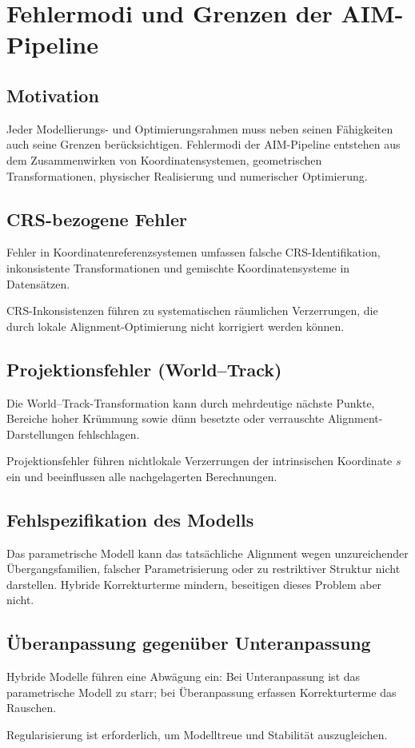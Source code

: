 \section{Fehlermodi und Grenzen der AIM-Pipeline}
\subsection*{Motivation}
Jeder Modellierungs- und Optimierungsrahmen muss neben seinen Fähigkeiten auch
seine Grenzen berücksichtigen. Fehlermodi der AIM-Pipeline entstehen aus dem
Zusammenwirken von Koordinatensystemen, geometrischen Transformationen,
physischer Realisierung und numerischer Optimierung.

\subsection{CRS-bezogene Fehler}
Fehler in Koordinatenreferenzsystemen umfassen falsche CRS-Identifikation,
inkonsistente Transformationen und gemischte Koordinatensysteme in Datensätzen.
\begin{proposition}
CRS-Inkonsistenzen führen zu systematischen räumlichen Verzerrungen, die durch
lokale Alignment-Optimierung nicht korrigiert werden können.
\end{proposition}

\subsection{Projektionsfehler (World--Track)}
Die World--Track-Transformation kann durch mehrdeutige nächste Punkte, Bereiche
hoher Krümmung sowie dünn besetzte oder verrauschte Alignment-Darstellungen
fehlschlagen.
\begin{proposition}
Projektionsfehler führen nichtlokale Verzerrungen der intrinsischen Koordinate
\(s\) ein und beeinflussen alle nachgelagerten Berechnungen.
\end{proposition}

\subsection{Fehlspezifikation des Modells}
Das parametrische Modell kann das tatsächliche Alignment wegen unzureichender
Übergangsfamilien, falscher Parametrisierung oder zu restriktiver Struktur
nicht darstellen. Hybride Korrekturterme mindern, beseitigen dieses Problem
aber nicht.

\subsection{Überanpassung gegenüber Unteranpassung}
Hybride Modelle führen eine Abwägung ein: Bei Unteranpassung ist das
parametrische Modell zu starr; bei Überanpassung erfassen Korrekturterme das
Rauschen.
\begin{proposition}
Regularisierung ist erforderlich, um Modelltreue und Stabilität auszugleichen.
\end{proposition}

